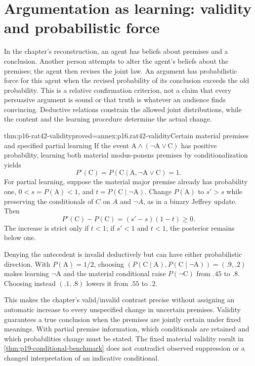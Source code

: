 \section{Argumentation as learning: validity and probabilistic force}
\label{sec:p16-rat42-argument-learning}

In the chapter's reconstruction, an agent has beliefs about premises and
a conclusion. Another person attempts to alter the agent's beliefs about
the premises; the agent then revises the joint law. An argument has
probabilistic force for this agent when the revised probability of its
conclusion exceeds the old probability. This is a relative confirmation
criterion, not a claim that every persuasive argument is sound or that
truth is whatever an audience finds convincing. Deductive relations
constrain the allowed joint distributions, while the content and the
learning procedure determine the actual change.
\cite[Sec.~4, pp.~259--260]{Hartmann2021BayesNets}

\begin{hbtheorem}{thm:p16-rat42-validity}{proved=annex:p16.rat42-validity}{Certain material premises and specified partial learning}
If the event \(\mathrm A\land(\neg\mathrm A\lor\mathrm C)\)
has positive probability, learning both material modus-ponens premises
by conditionalization yields
\[
 P'(\mathrm C)=P(\mathrm C\mid\mathrm A,
                                  \neg\mathrm A\lor\mathrm C)=1.
\]
For partial learning, suppose the material major premise already has
probability one, \(0<s=P(\mathrm A)<1\), and
\(t=P(\mathrm C\mid\neg\mathrm A)\). Change \(P(\mathrm A)\)
to \(s'>s\) while preserving the conditionals of \(C\) on
\(A\) and \(\neg A\), as in a binary Jeffrey update. Then
\[
 P'(\mathrm C)-P(\mathrm C)=(s'-s)(1-t)\geq0.
\]
The increase is strict only if \(t<1\); if \(s'<1\) and
\(t<1\), the posterior remains below one.

Denying the antecedent is invalid deductively but can have either
probabilistic direction. With \(P(\mathrm A)=1/2\), choosing
\((P(\mathrm C\mid\mathrm A),P(\mathrm C\mid\neg\mathrm A))
=(.9,.2)\) makes learning \(\neg\mathrm A\) and the material
conditional raise \(P(\neg\mathrm C)\) from \(.45\) to \(.8\).
Choosing instead \((.1,.8)\) lowers it from \(.55\) to \(.2\).
\end{hbtheorem}

This makes the chapter's valid/invalid contrast precise without assigning
an automatic increase to every unspecified change in uncertain premises.
Validity guarantees a true conclusion when the premises are jointly
certain under fixed meanings. With partial premise information, which
conditionals are retained and which probabilities change must be stated.
The fixed material validity result in
\cref{thm:p19-conditional-benchmark} does not contradict observed suppression
or a changed interpretation of an indicative conditional.

